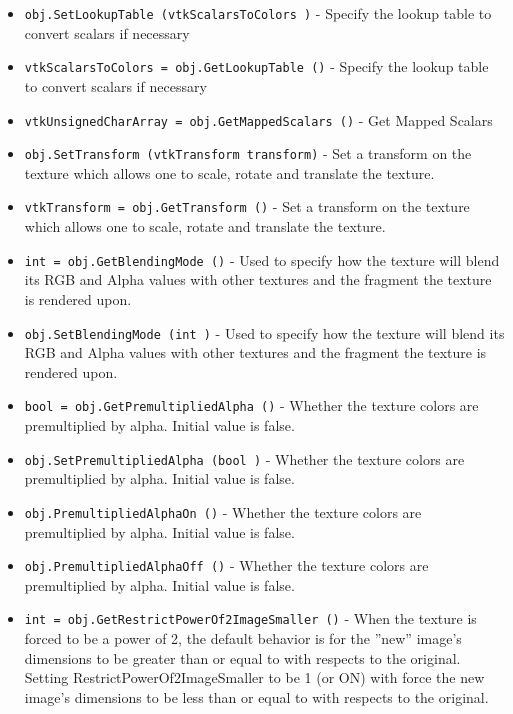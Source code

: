 \begin{itemize}
\item  \verb|obj.SetLookupTable (vtkScalarsToColors )| -  Specify the lookup table to convert scalars if necessary

\item  \verb|vtkScalarsToColors = obj.GetLookupTable ()| -  Specify the lookup table to convert scalars if necessary

\item  \verb|vtkUnsignedCharArray = obj.GetMappedScalars ()| -  Get Mapped Scalars

\item  \verb|obj.SetTransform (vtkTransform transform)| -  Set a transform on the texture which allows one to scale,
 rotate and translate the texture.

\item  \verb|vtkTransform = obj.GetTransform ()| -  Set a transform on the texture which allows one to scale,
 rotate and translate the texture.

\item  \verb|int = obj.GetBlendingMode ()| -  Used to specify how the texture will blend its RGB and Alpha values
 with other textures and the fragment the texture is rendered upon.

\item  \verb|obj.SetBlendingMode (int )| -  Used to specify how the texture will blend its RGB and Alpha values
 with other textures and the fragment the texture is rendered upon.

\item  \verb|bool = obj.GetPremultipliedAlpha ()| -  Whether the texture colors are premultiplied by alpha.
 Initial value is false.

\item  \verb|obj.SetPremultipliedAlpha (bool )| -  Whether the texture colors are premultiplied by alpha.
 Initial value is false.

\item  \verb|obj.PremultipliedAlphaOn ()| -  Whether the texture colors are premultiplied by alpha.
 Initial value is false.

\item  \verb|obj.PremultipliedAlphaOff ()| -  Whether the texture colors are premultiplied by alpha.
 Initial value is false.

\item  \verb|int = obj.GetRestrictPowerOf2ImageSmaller ()| -  When the texture is forced to be a power of 2, the default behavior is
 for the ''new'' image's dimensions  to be greater than or equal to with 
 respects to the original.  Setting RestrictPowerOf2ImageSmaller to be
 1 (or ON) with force the new image's dimensions to be less than or equal 
 to with respects to the original.


\end{itemize}
